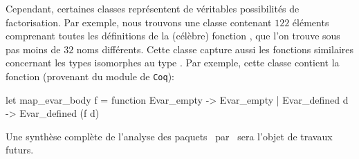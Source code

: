 Cependant, certaines classes représentent de véritables possibilités
de factorisation. Par exemple, nous trouvons une classe contenant
$122$ éléments comprenant toutes les définitions de la (célèbre)
fonction , que l'on trouve sous pas moins de $32$
noms différents. Cette classe capture aussi les fonctions similaires
concernant les types isomorphes au type . Par exemple,
cette classe contient la fonction  (provenant du
module  de \verb|Coq|):

\begin{ocaml}
let map_evar_body f = function Evar_empty -> Evar_empty | Evar_defined d -> Evar_defined (f d)
\end{ocaml}

Une synthèse complète de l'analyse des paquets~{\Opam} par~{\Asak} sera l'objet
de travaux futurs.
